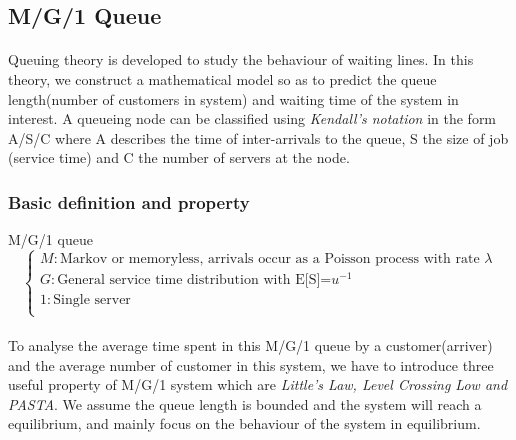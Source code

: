 \documentclass[project2.tex]{subfiles}
\begin{document}
\subsection{M/G/1 Queue}
\paragraph{}
Queuing theory is developed to study the behaviour of waiting lines. In this theory, we construct a mathematical model so as to predict the queue length(number of customers in system) and waiting time of the system in interest. A queueing node can be classified using {\it Kendall's notation} in the form A/S/C where A describes the time of inter-arrivals to the queue, S the size of job (service time) and C the number of servers at the node.    
\subsubsection{Basic definition and property}
\begin{definition}
M/G/1 queue
\begin{equation*}
\left\{
\begin{array}{lcl}
M:\text{Markov or memoryless, arrivals occur as a Poisson process with rate $\lambda$}\\
G:\text{General service time distribution with E[S]=$u^{-1}$}\\
1:\text{Single server}\\
\end{array} 
\right.
\end{equation*}
\end{definition}
\paragraph{}
To analyse the average time spent in this M/G/1 queue by a customer(arriver) and the average number of customer in this system, we have to introduce three useful property of M/G/1 system which are {\it Little's Law, Level Crossing Low and PASTA}. We assume the queue length is bounded and the system will reach a equilibrium, and mainly focus on the behaviour of the system in equilibrium.
\end{document}
